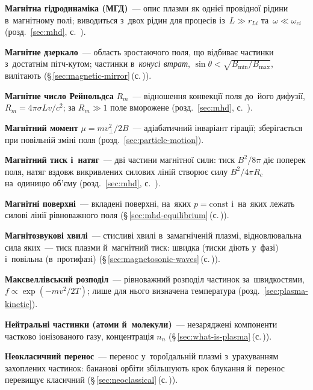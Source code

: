 	\item \textbf{Магнітна гідродинаміка (МГД)}~--- опис плазми як однієї провідної рідини в~магнітному полі; виводиться з~двох рідин для процесів із~$L\gg r_{Li}$ та~$\omega\ll\omega_{ci}$ (розд.~\ref{sec:mhd}, с.~\pageref{sec:mhd}).
	\item \textbf{Магнітне дзеркало}~--- область зростаючого поля, що відбиває частинки з~достатнім пітч-кутом; частинки в~\emph{конусі втрат}, $\sin\theta<\sqrt{B_{\min}/B_{\max}}$, вилітають (§\,\ref{sec:magnetic-mirror}\,(с.\,\pageref{sec:magnetic-mirror})).
	\item \textbf{Магнітне число Рейнольдса} $R_m$~--- відношення конвекції поля до~його дифузії, $R_m=4\pi\sigma Lv/c^2$; за $R_m\gg1$ поле вморожене (розд.~\ref{sec:mhd}, с.~\pageref{sec:mhd}).
	\item \textbf{Магнітний момент} $\mu=mv_\perp^2/2B$~--- адіабатичний інваріант гірації; зберігається при повільній зміні поля (розд.~\ref{sec:particle-motion}).
	\item \textbf{Магнітний тиск і~натяг}~--- дві частини магнітної сили: тиск $B^2/8\pi$ діє поперек поля, натяг вздовж викривлених силових ліній створює силу $B^2/4\pi R_c$ на~одиницю об'єму (розд.~\ref{sec:mhd}, с.~\pageref{sec:mhd}).
	\item \textbf{Магнітні поверхні}~--- вкладені поверхні, на~яких $p=\mathrm{const}$ і~на~яких лежать силові лінії рівноважного поля (§\,\ref{sec:mhd-equilibrium}\,(с.\,\pageref{sec:mhd-equilibrium})).
	\item \textbf{Магнітозвукові хвилі}~--- стисливі хвилі в~замагніченій плазмі, відновлювальна сила яких~--- тиск плазми й~магнітний тиск:
	  швидка (тиски діють у~фазі) і~повільна (в~протифазі) (§\,\ref{sec:magnetosonic-waves}\,(с.\,\pageref{sec:magnetosonic-waves})).
	\item \textbf{Максвеллівський розподіл}~--- рівноважний розподіл частинок за~швидкостями, $f\propto\exp(-mv^2/2T)$; лише для нього визначена температура (розд.~\ref{sec:plasma-kinetic}).
	\item \textbf{Нейтральні частинки (атоми й~молекули)}~--- незаряджені компоненти частково іонізованого газу,
	  концентрація $n_n$ (§\,\ref{sec:what-is-plasma}\,(с.\,\pageref{sec:what-is-plasma})).
	\item \textbf{Неокласичний перенос}~--- перенос у~тороїдальній плазмі з~урахуванням захоплених частинок: бананові орбіти збільшують крок блукання й~перенос перевищує класичний (§\,\ref{sec:neoclassical}\,(с.\,\pageref{sec:neoclassical})).
